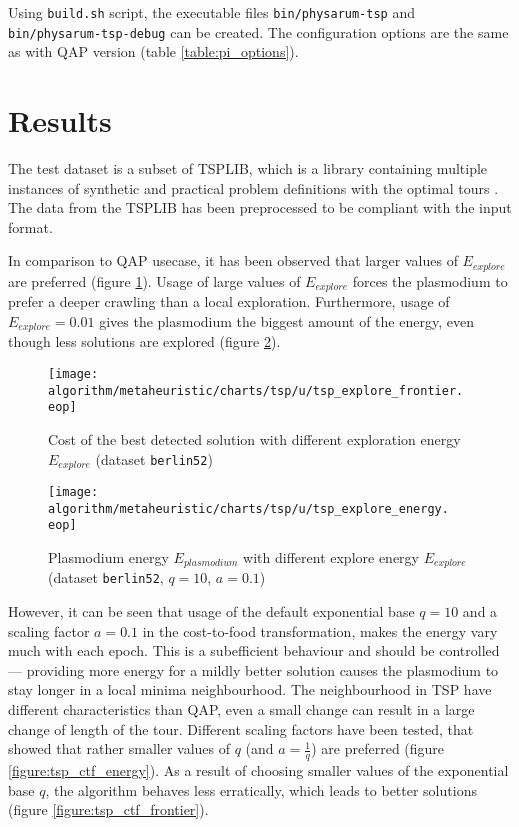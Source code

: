 Using \texttt{build.sh} script, the executable files \texttt{bin/physarum-tsp} and \texttt{bin/physarum-tsp-debug} can be created. The configuration options are the same as with QAP version (table \ref{table:pi_options}).


\section*{Results}

The test dataset is a subset of TSPLIB, which is a library containing multiple instances of synthetic and practical problem definitions with the optimal tours \cite{reinhelt2014tsplib}. The data from the TSPLIB has been preprocessed to be compliant with the input format.

In comparison to QAP usecase, it has been observed that larger values of $E_{explore}$ are preferred (figure \ref{figure:tsp_explore_frontier}). Usage of large values of $E_{explore}$ forces the plasmodium to prefer a deeper crawling than a local exploration. Furthermore, usage of $E_{explore}=0.01$ gives the plasmodium the biggest amount of the energy, even though less solutions are explored (figure \ref{figure:tsp_explore_energy}).



\begin{figure}
  \centering

  \texttt{[image: algorithm/metaheuristic/charts/tsp/u/tsp\_explore\_frontier.\\eop]}

  \caption{Cost of the best detected solution with different exploration energy $E_{explore}$ (dataset \texttt{berlin52})}
  \label{figure:tsp_explore_frontier}
\end{figure}

\begin{figure}
  \centering

  \texttt{[image: algorithm/metaheuristic/charts/tsp/u/tsp\_explore\_energy.\\eop]}

  \caption{Plasmodium energy $E_{plasmodium}$ with different explore energy $E_{explore}$ (dataset \texttt{berlin52}, $q=10$, $a=0.1$)}
  \label{figure:tsp_explore_energy}
\end{figure}

However, it can be seen that usage of the default exponential base $q=10$ and a scaling factor $a=0.1$ in the cost-to-food transformation, makes the energy vary much with each epoch. This is a subefficient behaviour and should be controlled --- providing more energy for a mildly better solution causes the plasmodium to stay longer in a local minima neighbourhood. The neighbourhood in TSP have different characteristics than QAP, even a small change can result in a large change of length of the tour. Different scaling factors have been tested, that showed that rather smaller values of $q$ (and $a=\frac{1}{q}$) are preferred (figure \ref{figure:tsp_ctf_energy}). As a result of choosing smaller values of the exponential base $q$, the algorithm behaves less erratically, which leads to better solutions (figure \ref{figure:tsp_ctf_frontier}).

